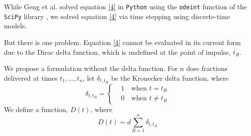 \documentclass[letterpaper
, superscriptaddress
, twocolumn
, aps
]{revtex4}
\begin{document}
While Geng et al. solved equation \eqref{4} in \texttt{Python} using the \texttt{odeint} function of the \texttt{SciPy} library \cite{Changran2018}, we solved equation \eqref{4} via time stepping using discrete-time models.

But there is one problem. Equation \eqref{4} cannot be evaluated in its current form due to the Dirac delta function, which is undefined at the point of impulse, $t_{R}$. 

We propose a formulation without the delta function. For $n$ dose fractions delivered at times $t_{1}, \dots, t_{n}$, let $\delta_{t,t_{R}}$ be the Kronecker delta function, where 
\begin{equation*}
	\delta_{t, t_{R}} = 
\begin{cases*}
&1 \quad \text{when $t = t_{R}$}\\
&0 \quad \text{when $t \not = t_{R}$}
\end{cases*}
\end{equation*}
We define a function, $D(t)$, where
\begin{equation}
D(t) = d \sum_{R = 1}^{n} \delta_{t, t_{R}}
\end{equation}
\end{document}
